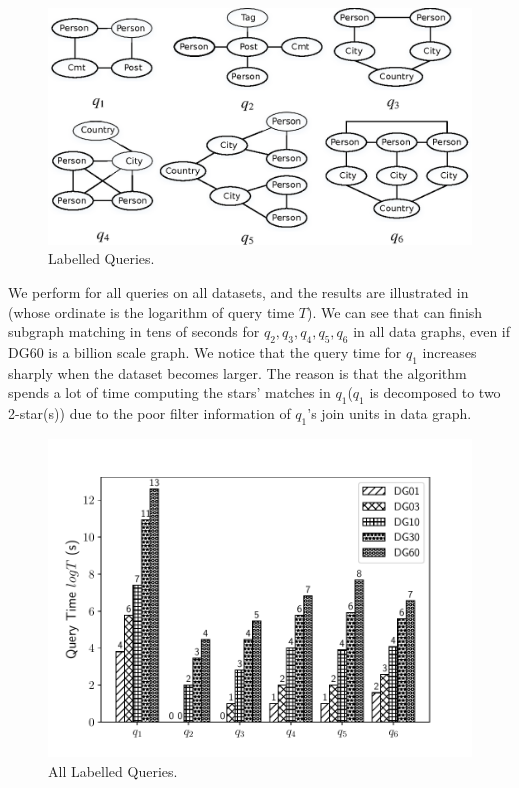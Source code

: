 \begin{figure}[htb]
  \centering
  \includegraphics[scale=0.6]{figures/lq.eps}
  \caption{\small{Labelled Queries.}}
  \label{fig:lq}
\end{figure}

 We perform \gencliqjoin for all queries on all datasets, and the results are illustrated in (whose ordinate is the logarithm of query time $T$). We can see that \gencliqjoin can finish subgraph matching in tens of seconds for $q_2, q_3, q_4, q_5, q_6$ in all data graphs, even if DG60 is a billion scale graph. We notice that the query time for $q_1$ increases sharply when the dataset becomes larger. The reason is that the algorithm spends a lot of time computing the stars' matches in $q_1$($q_1$ is decomposed to two 2-star(s)) due to the poor filter information of $q_1$'s join units in data graph.

\begin{figure}[htb]
  \centering
  \includegraphics[scale=0.4]{figures/exp4.pdf}
  \caption{\small{All Labelled Queries.}}
  \label{fig:all_lq}
\end{figure}

